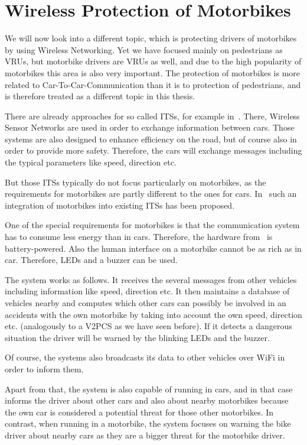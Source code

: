 \documentclass[]{ccs-thesis}
\begin{document}
\section{Wireless Protection of Motorbikes}\label{sec:motorbikes}

We will now look into a different topic, which is protecting drivers of motorbikes by using Wireless Networking. Yet we have focused mainly on pedestrians as \acp{VRU}, but motorbike drivers are \acp{VRU} as well, and due to the high popularity of motorbikes this area is also very important. The protection of motorbikes is more related to Car-To-Car-Communication than it is to protection of pedestrians, and is therefore treated as a different topic in this thesis.

There are already approaches for so called \acp{ITS}, for example in~\cite{its}. There, Wireless Sensor Networks are used in order to exchange information between cars.  Those systems are also designed to enhance efficiency on the road, but of course also in order to provide more safety. Therefore, the cars will exchange messages including the typical parameters like speed, direction etc.

But those \acp{ITS} typically do not focus particularly on motorbikes, as the requirements for motorbikes are partly different to the ones for cars. In~\cite{bikes} such an integration of motorbikes into existing \acp{ITS} has been proposed.

One of the special requirements for motorbikes is that the communication system has to consume less energy than in cars. Therefore, the hardware from~\cite{bikes} is battery-powered. Also the human interface on a motorbike cannot be as rich as in car. Therefore, LEDs and a buzzer can be used.

The system works as follows. It receives the several messages from other vehicles including information like speed, direction etc. It then maintains a database of vehicles nearby and computes which other cars can possibly be involved in an accidents with the own motorbike by taking into account the own speed, direction etc. (analogously to a \ac{V2PCS} as we have seen before). If it detects a dangerous situation the driver will be warned by the blinking LEDs and the buzzer.

Of course, the systems also broadcasts its data to other vehicles over WiFi in order to inform them.

Apart from that, the system is also capable of running in cars, and in that case informs the driver about other cars and also about nearby motorbikes because the own car is considered a potential threat for those other motorbikes. In contrast, when running in a motorbike, the system focuses on warning the bike driver about nearby cars as they are a bigger threat for the motorbike driver.
\end{document}
